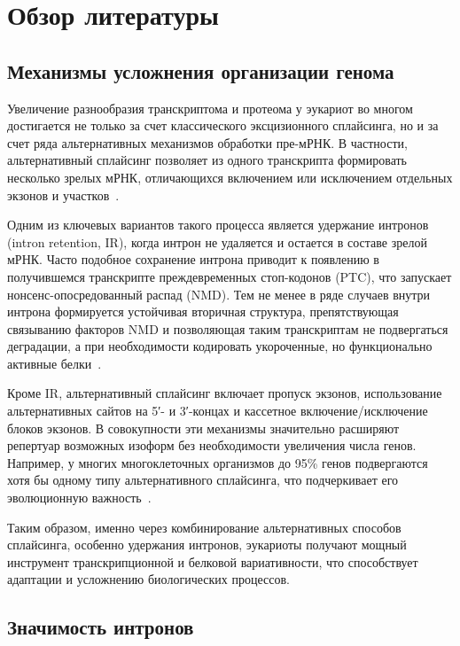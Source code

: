 \clearpage
\section{Обзор литературы}

\subsection{Механизмы усложнения организации генома}

Увеличение разнообразия транскриптома и протеома у эукариот во многом достигается не только за счет классического эксцизионного сплайсинга, но и за счет ряда альтернативных механизмов обработки пре-мРНК.
В частности, альтернативный сплайсинг позволяет из одного транскрипта формировать несколько зрелых мРНК, отличающихся включением или исключением отдельных экзонов и участков~\cite{Mamon2019,Juneau2006}.

Одним из ключевых вариантов такого процесса является удержание интронов (intron retention, IR), когда интрон не удаляется и остается в составе зрелой мРНК.
Часто подобное сохранение интрона приводит к появлению в получившемся транскрипте преждевременных стоп-кодонов (PTC), что запускает нонсенс-опосредованный распад (NMD).
Тем не менее в ряде случаев внутри интрона формируется устойчивая вторичная структура, препятствующая связыванию факторов NMD и позволяющая таким транскриптам не подвергаться деградации, а при необходимости кодировать укороченные, но функционально активные белки~\cite{Mamon2013,Jo2015,Kalyna2012}.

Кроме IR, альтернативный сплайсинг включает пропуск экзонов, использование альтернативных сайтов на 5′- и 3′-концах и кассетное включение/исключение блоков экзонов.
В совокупности эти механизмы значительно расширяют репертуар возможных изоформ без необходимости увеличения числа генов.
Например, у многих многоклеточных организмов до 95\% генов подвергаются хотя бы одному типу альтернативного сплайсинга, что подчеркивает его эволюционную важность~\cite{Mamon2019}.

Таким образом, именно через комбинирование альтернативных способов сплайсинга, особенно удержания интронов, эукариоты получают мощный инструмент транскрипционной и белковой вариативности, что способствует адаптации и усложнению биологических процессов.


\subsection{Значимость интронов}

